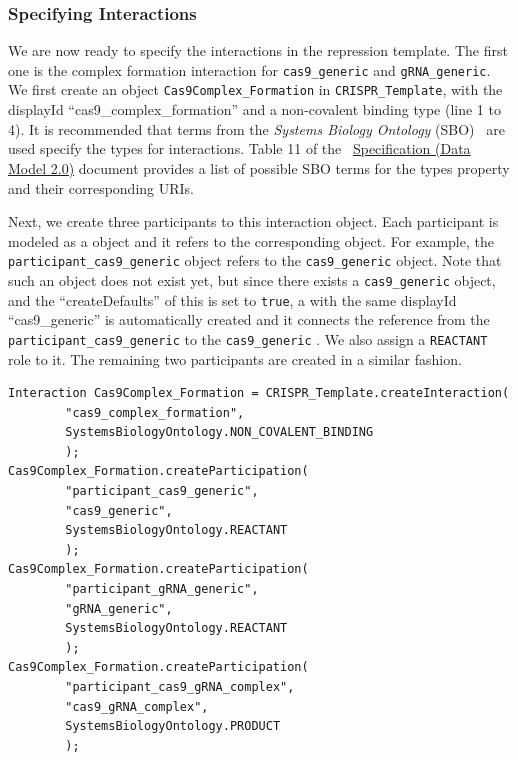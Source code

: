 \subsubsection*{Specifying Interactions}
We are now ready to specify the interactions in the repression template. The first one is the complex formation interaction for \lstinline+cas9_generic+ and \lstinline+gRNA_generic+. We first create an  object \lstinline+Cas9Complex_Formation+ in \lstinline+CRISPR_Template+, with the displayId ``cas9\_complex\_formation'' and a non-covalent binding type (line 1 to 4). It is recommended that terms from the \emph{Systems Biology Ontology} (SBO)~\cite{Courtot2011} are used specify the types for interactions. Table 11 of the ~\href{http://sbolstandard.org/downloads/specification-data-model-2-0/}{Specification  (Data Model 2.0)} document provides a list of possible SBO terms for the types property and their corresponding URIs. 

Next, we create three participants to this interaction object. Each participant is modeled as a  object and it refers to the corresponding  object. For example, the \lstinline+participant_cas9_generic+  object refers to the \lstinline+cas9_generic+  object. Note that such an object does not exist yet, but since there exists a \lstinline+cas9_generic+  object, and the ``createDefaults'' of this  is set to \lstinline+true+, a  with the same displayId ``cas9\_generic'' is automatically created and it connects the reference from the \lstinline+participant_cas9_generic+  to the \lstinline+cas9_generic+ . We also assign a \lstinline+REACTANT+ role to it. The remaining two participants are created in a similar fashion.

\vspace{\abovedisplayskip}
\begin{minipage}{0.95\textwidth}%
\begin{lstlisting}
Interaction Cas9Complex_Formation = CRISPR_Template.createInteraction(
        "cas9_complex_formation", 
        SystemsBiologyOntology.NON_COVALENT_BINDING
        );
Cas9Complex_Formation.createParticipation(
        "participant_cas9_generic", 
        "cas9_generic",
        SystemsBiologyOntology.REACTANT
        );
Cas9Complex_Formation.createParticipation(
        "participant_gRNA_generic", 
        "gRNA_generic",
        SystemsBiologyOntology.REACTANT
        );
Cas9Complex_Formation.createParticipation(
        "participant_cas9_gRNA_complex", 
        "cas9_gRNA_complex",
        SystemsBiologyOntology.PRODUCT
        );
\end{lstlisting}
\end{minipage}

